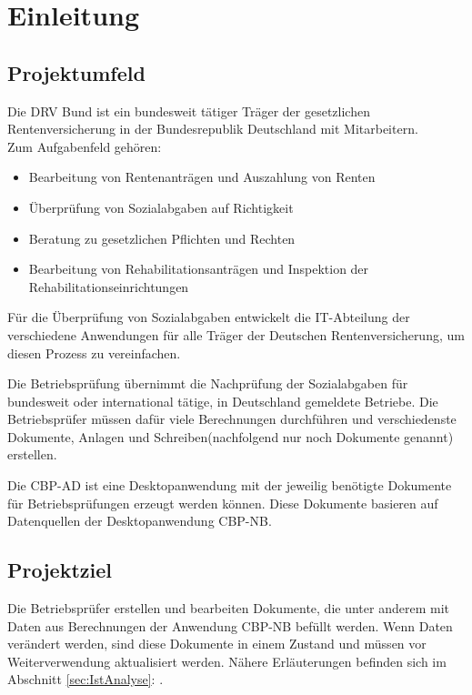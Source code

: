 
\section{Einleitung}
\label{sec:Einleitung}


\subsection{Projektumfeld} 
\label{sec:Projektumfeld}

Die \ac{DRV Bund} ist ein bundesweit tätiger Träger der gesetzlichen Rentenversicherung in der Bundesrepublik Deutschland
mit  Mitarbeitern.\\
Zum Aufgabenfeld gehören:
\begin{itemize}
	\item Bearbeitung von Rentenanträgen und Auszahlung von Renten
	\item Überprüfung von Sozialabgaben auf Richtigkeit
	\item Beratung zu gesetzlichen Pflichten und Rechten
	\item Bearbeitung von Rehabilitationsanträgen und Inspektion der Rehabilitationseinrichtungen
\end{itemize}

Für die Überprüfung von Sozialabgaben entwickelt die IT-Abteilung der \DRV verschiedene Anwendungen für alle Träger der Deutschen Rentenversicherung, um diesen Prozess zu vereinfachen.

Die Betriebsprüfung übernimmt die Nachprüfung der Sozialabgaben für bundesweit oder international tätige, in Deutschland gemeldete Betriebe. Die Betriebsprüfer müssen dafür viele Berechnungen durchführen und verschiedenste Dokumente, Anlagen und Schreiben(nachfolgend nur noch Dokumente genannt) erstellen.

Die \ac{CBP-AD} ist eine Desktopanwendung mit der jeweilig benötigte Dokumente für Betriebsprüfungen erzeugt werden können. Diese Dokumente basieren auf Datenquellen der Desktopanwendung \ac{CBP-NB}.


\subsection{Projektziel} 
\label{sec:Projektziel}

Die Betriebsprüfer erstellen und bearbeiten Dokumente, die unter anderem mit Daten aus Berechnungen der Anwendung \acs{CBP-NB} befüllt werden. Wenn Daten verändert werden, sind diese Dokumente in einem  Zustand und müssen vor Weiterverwendung aktualisiert werden. Nähere Erläuterungen befinden sich im Abschnitt \ref{sec:IstAnalyse}: .

